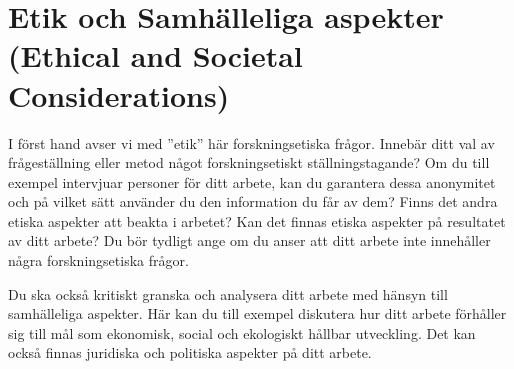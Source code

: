 \section{Etik och Samhälleliga aspekter (Ethical and Societal Considerations)}

I först hand avser vi med ”etik” här forskningsetiska frågor. Innebär ditt val av frågeställning eller metod något forskningsetiskt ställningstagande? Om du till exempel intervjuar personer för ditt arbete, kan du garantera dessa anonymitet och på vilket sätt använder du den information du får av dem? Finns det andra etiska aspekter att beakta i arbetet? Kan det finnas etiska aspekter på resultatet av ditt arbete? Du bör tydligt ange om du anser att ditt arbete inte innehåller några forskningsetiska frågor. 

Du ska också kritiskt granska och analysera ditt arbete med hänsyn till samhälleliga aspekter. Här kan du till exempel diskutera hur ditt arbete förhåller sig till mål som ekonomisk, social och ekologiskt hållbar utveckling. Det kan också finnas juridiska och politiska aspekter på ditt arbete. 
